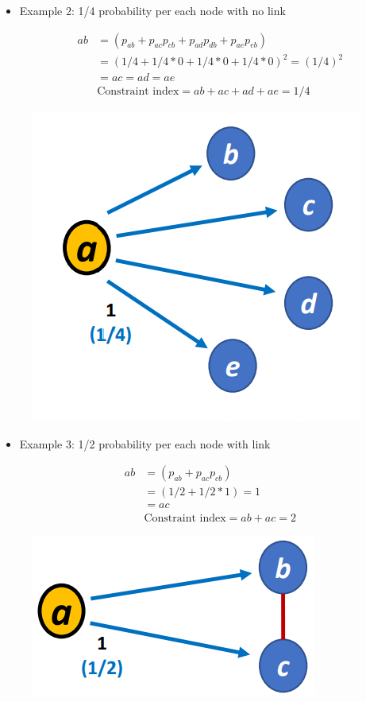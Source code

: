 \documentclass[
  notitlepage,
  onecolumn,
  openany]{book}
\begin{document}
\begin{itemize}
\item
  Example 2: 1/4 probability per each node with no link

  \[
    \begin{aligned}
    ab &= (p_{ab}+p_{ac}p_{cb}+p_{ad}p_{db}+p_{ae}p_{eb})
    \\&= (1/4+1/4*0+1/4*0+1/4*0)^2 =(1/4)^2 \\
    & = ac = ad = ae\\
    &\text{Constraint index} = ab+ac+ad+ae = 1/4
    \end{aligned}
    \]
\end{itemize}

\begin{figure}[h!]

{\centering \includegraphics[width=0.4\linewidth]{images/08-Metrics for structural holes/Untitled 1} 

}

\end{figure}

\begin{itemize}
\item
  Example 3: 1/2 probability per each node with link

  \[
    \begin{aligned}
    ab &= (p_{ab}+p_{ac}p_{cb})
    \\&= (1/2+1/2*1)=1\\
    & = ac\\
    &\text{Constraint index} = ab+ac= 2
    \end{aligned}
    \]
\end{itemize}

\begin{figure}[h!]

{\centering \includegraphics[width=0.4\linewidth]{images/08-Metrics for structural holes/Untitled 2} 

}

\end{figure}
\end{document}
